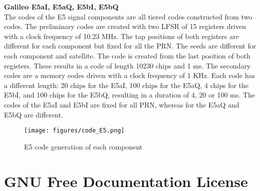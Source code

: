 \documentclass[openany,10pt,twoside,a4paper]{book}
\begin{document}
\noindent
\textbf{Galileo E5aI, E5aQ, E5bI, E5bQ} \\
The codes of the E5 signal components are all tiered codes constructed from two codes. The preliminary codes are created with two LFSR of 15 registers driven with a clock frequency of 10.23 MHz. The tap positions of both registers are different for each component but fixed for all the PRN. The seeds are different for each component and satellite. The code is created from the last position of both registers. These results in a code of length 10230 chips and 1 ms. The secondary codes are a memory codes driven with a clock frequency of 1 KHz. Each code has a different length: 20 chips for the E5aI, 100 chips for the E5aQ, 4 chips for the E5bI, and 100 chips for the E5bQ, resulting in a duration of 4, 20 or 100 ms. The codes of the E5aI and E5bI are fixed for all PRN, whereas for the E5aQ and E5bQ are different.
\begin{figure}[tb]
\centering
\texttt{[image: figures/code\_E5.png]}
\caption{E5 code generation of each component}
\label{fig:code_E5}
\end{figure}





\chapter{GNU Free Documentation License}





	
\end{document}
